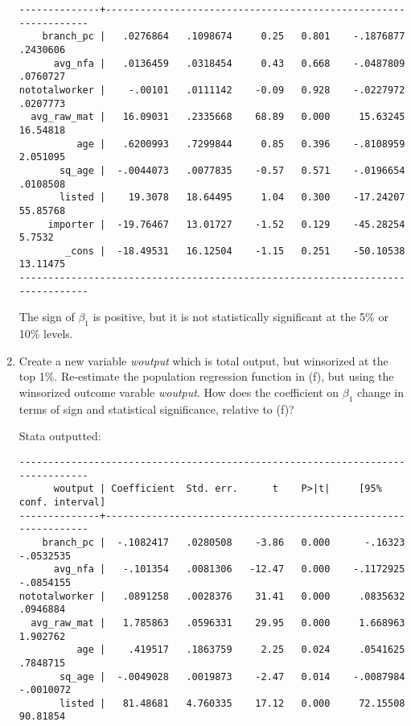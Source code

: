 \documentclass[11pt,twoside,openany]{memoir}
\begin{document}
\begin{question}
\begin{enumerate}[label = (\alph*),itemsep=1pt,topsep=3pt]
{\begin{solution}
\begin{Verbatim}[fontsize=\footnotesize]
--------------+----------------------------------------------------------------
    branch_pc |   .0276864   .1098674     0.25   0.801    -.1876877    .2430606
      avg_nfa |   .0136459   .0318454     0.43   0.668    -.0487809    .0760727
nototalworker |    -.00101   .0111142    -0.09   0.928    -.0227972    .0207773
  avg_raw_mat |   16.09031   .2335668    68.89   0.000     15.63245    16.54818
          age |   .6200993   .7299844     0.85   0.396    -.8108959    2.051095
       sq_age |  -.0044073   .0077835    -0.57   0.571    -.0196654    .0108508
       listed |    19.3078   18.64495     1.04   0.300    -17.24207    55.85768
     importer |  -19.76467   13.01727    -1.52   0.129    -45.28254      5.7532
        _cons |  -18.49531   16.12504    -1.15   0.251    -50.10538    13.11475
-------------------------------------------------------------------------------
                \end{Verbatim}
                The sign of $\beta_1$ is positive, but it is not statistically significant at the 5\% or 10\% levels.
            \end{solution}}
        \newpage
        \item Create a new variable \textit{woutput} which is total output, but winsorized at the top 1\%. Re-estimate the population regression function in (f), but using the winsorized outcome varable \textit{woutput}. How does the coefficient on $\beta_1$ change in terms of sign and statistical significance, relative to (f)?
            {\color{blue} \begin{solution}
                Stata outputted:
                \begin{Verbatim}[fontsize=\footnotesize]
-------------------------------------------------------------------------------
      woutput | Coefficient  Std. err.      t    P>|t|     [95% conf. interval]
--------------+----------------------------------------------------------------
    branch_pc |  -.1082417   .0280508    -3.86   0.000      -.16323   -.0532535
      avg_nfa |   -.101354   .0081306   -12.47   0.000    -.1172925   -.0854155
nototalworker |   .0891258   .0028376    31.41   0.000     .0835632    .0946884
  avg_raw_mat |   1.785863   .0596331    29.95   0.000     1.668963    1.902762
          age |    .419517   .1863759     2.25   0.024     .0541625    .7848715
       sq_age |  -.0049028   .0019873    -2.47   0.014    -.0087984   -.0010072
       listed |   81.48681   4.760335    17.12   0.000     72.15508    90.81854

\end{Verbatim}
\end{solution}}
\end{enumerate}
\end{question}
\end{document}
